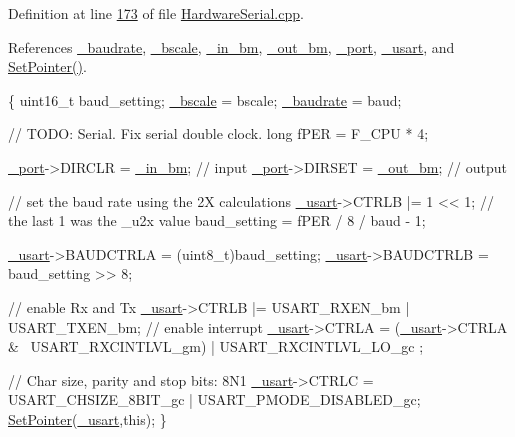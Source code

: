Definition at line \hyperlink{_hardware_serial_8cpp_source_l00173}{173} of file \hyperlink{_hardware_serial_8cpp_source}{HardwareSerial.cpp}.



References \hyperlink{_hardware_serial_8h_source_l00033}{\_\-baudrate}, \hyperlink{_hardware_serial_8h_source_l00032}{\_\-bscale}, \hyperlink{_hardware_serial_8h_source_l00029}{\_\-in\_\-bm}, \hyperlink{_hardware_serial_8h_source_l00030}{\_\-out\_\-bm}, \hyperlink{_hardware_serial_8h_source_l00028}{\_\-port}, \hyperlink{_hardware_serial_8h_source_l00027}{\_\-usart}, and \hyperlink{_hardware_serial_8cpp_source_l00061}{SetPointer()}.


\begin{DoxyCode}
\{
    uint16\_t baud\_setting;
    \hyperlink{class_hardware_serial_a37dd406c01fd6432618925f0aeb329f3}{_bscale} = bscale;
    \hyperlink{class_hardware_serial_ae692ab4a0a8aad73c74a10066fa9da24}{_baudrate} = baud;
    
    \textcolor{comment}{// TODO: Serial. Fix serial double clock.}
    \textcolor{keywordtype}{long} fPER = F\_CPU * 4;
    
    \hyperlink{class_hardware_serial_add54c7d986c6122e8e8c23303f5b4845}{_port}->DIRCLR = \hyperlink{class_hardware_serial_a8724fdfd3955eeff5d3ed535624ce79a}{_in_bm};  \textcolor{comment}{// input}
    \hyperlink{class_hardware_serial_add54c7d986c6122e8e8c23303f5b4845}{_port}->DIRSET = \hyperlink{class_hardware_serial_a751a284e15af72b026143a8091be1b70}{_out_bm}; \textcolor{comment}{// output}
    
    \textcolor{comment}{// set the baud rate using the 2X calculations}
    \hyperlink{class_hardware_serial_a3a3bd56aa561ae7e1eb1fd252b5b69a0}{_usart}->CTRLB |= 1 << 1; \textcolor{comment}{// the last 1 was the \_u2x value}
    baud\_setting = fPER / 8 / baud - 1;

    \hyperlink{class_hardware_serial_a3a3bd56aa561ae7e1eb1fd252b5b69a0}{_usart}->BAUDCTRLA = (uint8\_t)baud\_setting;
    \hyperlink{class_hardware_serial_a3a3bd56aa561ae7e1eb1fd252b5b69a0}{_usart}->BAUDCTRLB = baud\_setting >> 8;
    
    
    \textcolor{comment}{// enable Rx and Tx}
    \hyperlink{class_hardware_serial_a3a3bd56aa561ae7e1eb1fd252b5b69a0}{_usart}->CTRLB |= USART\_RXEN\_bm | USART\_TXEN\_bm;
    \textcolor{comment}{// enable interrupt}
    \hyperlink{class_hardware_serial_a3a3bd56aa561ae7e1eb1fd252b5b69a0}{_usart}->CTRLA = (\hyperlink{class_hardware_serial_a3a3bd56aa561ae7e1eb1fd252b5b69a0}{_usart}->CTRLA & ~USART\_RXCINTLVL\_gm) | USART\_RXCINTLVL\_LO\_gc
      ;
    
    \textcolor{comment}{// Char size, parity and stop bits: 8N1}
    \hyperlink{class_hardware_serial_a3a3bd56aa561ae7e1eb1fd252b5b69a0}{_usart}->CTRLC = USART\_CHSIZE\_8BIT\_gc | USART\_PMODE\_DISABLED\_gc;
    \hyperlink{_hardware_serial_8cpp_aaec4e4f887a958cc22dd447565d7080b}{SetPointer}(\hyperlink{class_hardware_serial_a3a3bd56aa561ae7e1eb1fd252b5b69a0}{_usart},\textcolor{keyword}{this});
\}
\end{DoxyCode}
